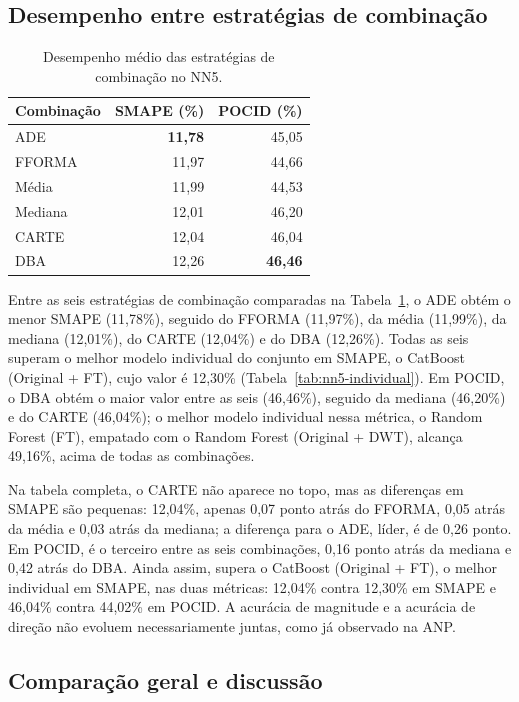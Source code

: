 \subsection{Desempenho entre estratégias de combinação}

\begin{table}[H]
\centering
\caption{Desempenho médio das estratégias de combinação no NN5.}
\label{tab:nn5-estaticas}
\begin{tabular}{@{}lrr@{}}
\toprule
\textbf{Combinação} & \textbf{SMAPE (\%)} & \textbf{POCID (\%)} \\
\midrule
ADE     & \textbf{11,78} & 45,05 \\
FFORMA  & 11,97 & 44,66 \\
Média   & 11,99 & 44,53 \\
Mediana & 12,01 & 46,20 \\
CARTE   & 12,04 & 46,04 \\
DBA     & 12,26 & \textbf{46,46} \\
\bottomrule
\end{tabular}
\end{table}

Entre as seis estratégias de combinação comparadas na Tabela~\ref{tab:nn5-estaticas}, o ADE obtém o menor SMAPE (11,78\%), seguido do FFORMA (11,97\%), da média (11,99\%), da mediana (12,01\%), do CARTE (12,04\%) e do DBA (12,26\%). Todas as seis superam o melhor modelo individual do conjunto em SMAPE, o CatBoost (Original + FT), cujo valor é 12,30\% (Tabela~\ref{tab:nn5-individual}). Em POCID, o DBA obtém o maior valor entre as seis (46,46\%), seguido da mediana (46,20\%) e do CARTE (46,04\%); o melhor modelo individual nessa métrica, o Random Forest (FT), empatado com o Random Forest (Original + DWT), alcança 49,16\%, acima de todas as combinações.

Na tabela completa, o CARTE não aparece no topo, mas as diferenças em SMAPE são pequenas: 12,04\%, apenas 0,07 ponto atrás do FFORMA, 0,05 atrás da média e 0,03 atrás da mediana; a diferença para o ADE, líder, é de 0,26 ponto. Em POCID, é o terceiro entre as seis combinações, 0,16 ponto atrás da mediana e 0,42 atrás do DBA. Ainda assim, supera o CatBoost (Original + FT), o melhor individual em SMAPE, nas duas métricas: 12,04\% contra 12,30\% em SMAPE e 46,04\% contra 44,02\% em POCID. A acurácia de magnitude e a acurácia de direção não evoluem necessariamente juntas, como já observado na ANP.

\subsection{Comparação geral e discussão} \label{subsec:nn5-discussao}

